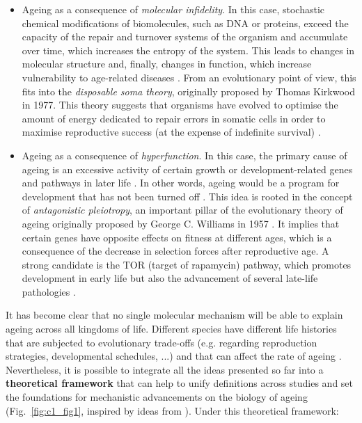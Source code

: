 \begin{itemize}
	
	\item Ageing as a consequence of \textit{molecular infidelity}. In this case, stochastic chemical modifications of biomolecules, such as DNA or proteins, exceed the capacity of the repair and turnover systems of the organism and accumulate over time, which increases the entropy of the system. This leads to changes in molecular structure and, finally, changes in function, which increase vulnerability to age-related diseases \cite{Hayflick2007,Hayflick2007a}. From an evolutionary point of view, this fits into the \textit{disposable soma theory}, originally proposed by Thomas Kirkwood in 1977. This theory suggests that organisms have evolved to optimise the amount of energy dedicated to repair errors in somatic cells in order to maximise reproductive success (at the expense of indefinite survival) \cite{Kirkwood1977,Kirkwood1991}. 
	
	\item Ageing as a consequence of \textit{hyperfunction}. In this case, the primary cause of ageing is an excessive activity of certain growth or development-related genes and pathways in later life \cite{Blagosklonny2006,Blagosklonny2010,DeMagalhaes2012,Gems2015}. In other words, ageing would be a program for development that has not been turned off \cite{Blagosklonny2006}. This idea is rooted in the concept of \textit{antagonistic pleiotropy}, an important pillar of the evolutionary theory of ageing originally proposed by George C. Williams in 1957 \cite{Williams1957}. It implies that certain genes have opposite effects on fitness at different ages, which is a consequence of the decrease in selection forces after reproductive age. A strong candidate is the \acrshort{TOR} (target of rapamycin) pathway, which promotes development in early life but also the advancement of several late-life pathologies \cite{Blagosklonny2010}. 
	
\end{itemize}

It has become clear that no single molecular mechanism will be able to explain ageing across all kingdoms of life. Different species have different life histories that are subjected to evolutionary trade-offs (e.g. regarding reproduction strategies, developmental schedules, ...) and that can affect the rate of ageing \cite{Jones2013,Ricklefs2010}. Nevertheless, it is possible to integrate all the ideas presented so far into a \textbf{theoretical framework} that can help to unify definitions across studies and set the foundations for mechanistic advancements on the biology of ageing (Fig.~\ref{fig:c1_fig1}, inspired by ideas from \cite{Hayflick2007,Gems2015,Peto1997,Stroustrup2016,Freund2019}). Under this theoretical framework: 

